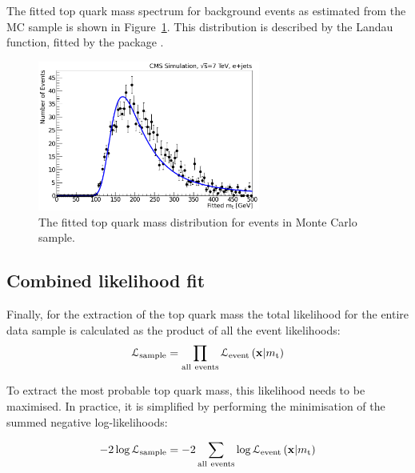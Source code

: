 The fitted top quark mass spectrum for background events as estimated from the \WpJets MC sample is shown in
Figure~\ref{fig:background_wjets_fitted_top_mass}. This distribution is described by the Landau function, fitted by the
\ROOT package \autocite{Landau}.

\begin{figure}[!htpb]
	\centering
	\includegraphics[width=0.65\textwidth]{background_wjets_fitted_top_mass}
	\caption{\label{fig:background_wjets_fitted_top_mass}
	The fitted top quark mass distribution for \ttbar events in \WpJets Monte Carlo sample.}
\end{figure}

\subsection{Combined likelihood fit}
\label{ss_top_mass:likelihood_fit}

Finally, for the extraction of the top quark mass the total likelihood for the entire data sample is calculated as the
product of all the event likelihoods:
\begin{equation}
\mathcal{L}_{\rm sample} = \prod_{\rm all~events}
\mathcal{L}_\textrm{event} \left(\mathbf{x}|m_\mathrm{t} \right)
\label{eq:CombinedLikelihood}
\end{equation}

To extract the most probable top quark mass, this likelihood needs to be maximised. In practice, it is simplified by
performing the minimisation of the summed negative log-likelihoods:

\begin{equation}
 -2\log{\mathcal{L}_{\rm sample}} = -2 \sum_{\rm all~events} \log{\mathcal{L}_\textrm{event} \left(\mathbf{x}|\mtop
 \right)}
\label{eq:CombinedLogLikelihood}
\end{equation}

